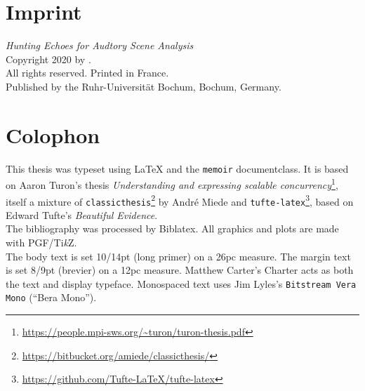 \clearpage{}

\thispagestyle{empty}
\hphantom{.}
\vfill

\section*{Imprint}

\textit{Hunting Echoes for Audtory Scene Analysis}\\
Copyright \textcopyright{} 2020 by \theauthor{}.\\
All rights reserved. Printed in France.\\
Published by the Ruhr-Universität Bochum, Bochum, Germany.

\section*{Colophon}

This thesis was typeset using \LaTeX{} and the \texttt{memoir} documentclass.
It is based on Aaron Turon's thesis \emph{Understanding and expressing scalable concurrency}\footnote{\url{https://people.mpi-sws.org/~turon/turon-thesis.pdf}}, itself a mixture of \texttt{classicthesis}\footnote{\url{https://bitbucket.org/amiede/classicthesis/}} by Andr\'e Miede and \texttt{tufte-latex}\footnote{\url{https://github.com/Tufte-LaTeX/tufte-latex}}, based on Edward Tufte's \emph{Beautiful Evidence}.\\[0.5\baselineskip]
%
The bibliography was processed by Biblatex.
All graphics and plots are made with PGF/Ti\emph{k}Z.\\[0.5\baselineskip]
%
The body text is set 10/14pt (long primer) on a 26pc measure.
The margin text is set 8/9pt (brevier) on a 12pc measure.
Matthew Carter's \textrm{Charter} acts as both the text and display typeface.
Monospaced text uses Jim Lyles's \texttt{Bitstream Vera Mono} (\enquote{Bera Mono}).

\clearpage{}


